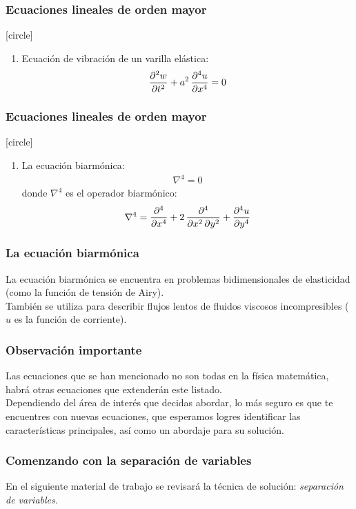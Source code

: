 \documentclass[12pt]{beamer}
\begin{document}
\begin{frame}
\frametitle{Ecuaciones lineales de orden mayor}
[circle]
\begin{enumerate}[<+->]    
\item Ecuación de vibración de un varilla elástica:
\pause
\begin{align*}
\pdv[2]{w}{t} + a^{2} \, \pdv[4]{u}{x} = 0
\end{align*}
\seti
\end{enumerate}
\end{frame}
\begin{frame}
\frametitle{Ecuaciones lineales de orden mayor}
[circle]
\begin{enumerate}[<+->]    
\conti
\item La ecuación biarmónica:
\pause
\begin{align*}
\nabla^{4} = 0
\end{align*}
donde $\nabla^{4}$ es el operador biarmónico:
\begin{align*}
\nabla^{4} = \pdv[4]{x} + 2 \, \dfrac{\partial^{4}}{\partial x^{2} \, \partial y^{2}} + \pdv[4]{u}{y}
\end{align*}
\end{enumerate}
\end{frame}
\begin{frame}
\frametitle{La ecuación biarmónica}
La ecuación biarmónica se encuentra en problemas bidimensionales de elasticidad (como la función de tensión de Airy).
\\
\bigskip
\pause
También se utiliza para describir flujos lentos de fluidos viscosos incompresibles ($u$ es la función de corriente).
\end{frame}
\begin{frame}
\frametitle{Observación importante}
Las ecuaciones que se han mencionado no son todas en la física matemática, habrá otras ecuaciones que extenderán este listado.
\\
\bigskip
\pause
Dependiendo del área de interés que decidas abordar, lo más seguro es que te encuentres con nuevas ecuaciones, que esperamos logres identificar las características principales, así como un abordaje para su solución.
\end{frame}
\begin{frame}
\frametitle{Comenzando con la separación de variables}
En el siguiente material de trabajo se revisará la técnica de solución: \emph{separación de variables.}
\end{frame}
\end{document}
